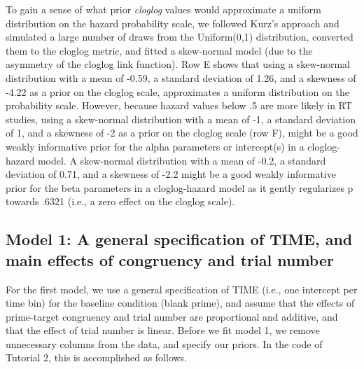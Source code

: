 \documentclass[
  man,floatsintext]{apa6}
\begin{document}
To gain a sense of what prior \emph{cloglog} values would approximate a uniform distribution on the hazard probability scale, we followed Kurz's approach and simulated a large number of draws from the Uniform(0,1) distribution, converted them to the cloglog metric, and fitted a skew-normal model (due to the asymmetry of the cloglog link function). Row E shows that using a skew-normal distribution with a mean of -0.59, a standard deviation of 1.26, and a skewness of -4.22 as a prior on the cloglog scale, approximates a uniform distribution on the probability scale.
However, because hazard values below .5 are more likely in RT studies, using a skew-normal distribution with a mean of -1, a standard deviation of 1, and a skewness of -2 as a prior on the cloglog scale (row F), might be a good weakly informative prior for the alpha parameters or intercept(s) in a cloglog-hazard model.
A skew-normal distribution with a mean of -0.2, a standard deviation of 0.71, and a skewness of -2.2 might be a good weakly informative prior for the beta parameters in a cloglog-hazard model as it gently regularizes p towards .6321 (i.e., a zero effect on the cloglog scale).

\subsection{Model 1: A general specification of TIME, and main effects of congruency and trial number}\label{model-1-a-general-specification-of-time-and-main-effects-of-congruency-and-trial-number}

For the first model, we use a general specification of TIME (i.e., one intercept per time bin) for the baseline condition (blank prime), and assume that the effects of prime-target congruency and trial number are proportional and additive, and that the effect of trial number is linear.
Before we fit model 1, we remove unnecessary columns from the data, and specify our priors. In the code of Tutorial 2, this is accomplished as follows.

\scriptsize
\end{document}
